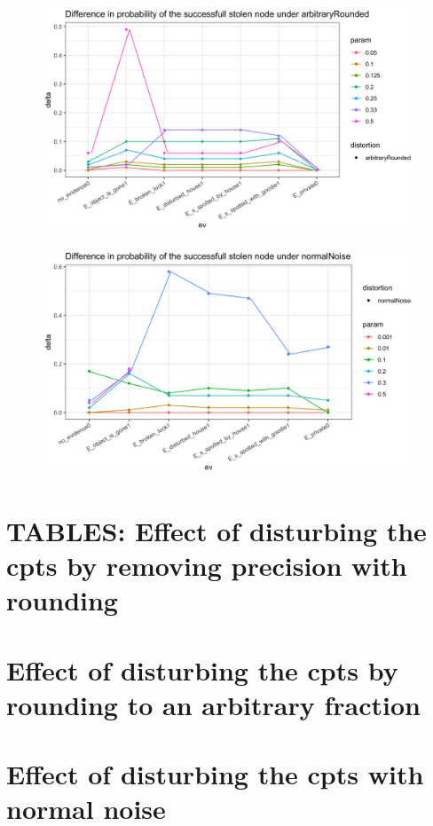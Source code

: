 \documentclass[11pt]{amsart}
\begin{document}
\begin{figure}[htbp]
\begin{center}
\includegraphics[scale=0.17]{images/arbitraryRoundeddelta.png}
\label{default}
\end{center}
\end{figure}

\begin{figure}[htbp]
\begin{center}
\includegraphics[scale=0.17]{images/normalNoisedelta.png}
\label{default}
\end{center}
\end{figure}


\clearpage


\section{TABLES: Effect of disturbing the cpts by removing precision with rounding}
\let\oldcentering\centering
\renewcommand\centering{\tiny\oldcentering}

\clearpage
\section{Effect of disturbing the cpts by rounding to an arbitrary fraction}

\clearpage
\section{Effect of disturbing the cpts with normal noise}

\clearpage
\end{document}
